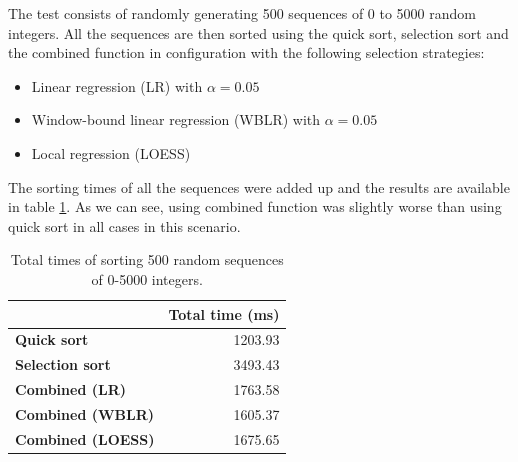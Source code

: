 The test consists of randomly generating 500 sequences of 0 to 5000 random integers. All the sequences are then sorted using the quick sort, selection sort and the combined function in configuration with the following selection strategies:

\begin{itemize}
	\item Linear regression (LR) with $\alpha = 0.05$
	\item Window-bound linear regression (WBLR) with $\alpha = 0.05$
	\item Local regression (LOESS)
\end{itemize}

The sorting times of all the sequences were added up and the results are available in table \ref{tab:sorting_results}. As we can see, using combined function was slightly worse than using quick sort in all cases in this scenario.

\begin{table}[h!]
	\captionsetup{justification=centering,margin=0.5cm}
	\bgroup
	\def\arraystretch{1.5}%
	\begin{center}
	\begin{tabular}{|l|r|}
		\hline
		& \multicolumn{1}{c|}{\textbf{Total time (ms)}} \\ \hline
		\textbf{Quick sort}                  & 1203.93                                       \\ \hline
		\textbf{Selection sort}              & 3493.43                                       \\ \hline
		\textbf{Combined (LR)}               & 1763.58                                       \\ \hline
		\textbf{Combined (WBLR)}  & 1605.37                                       \\ \hline
		\textbf{Combined (LOESS)} & 1675.65                                       \\ \hline
	\end{tabular}
\end{center}
\egroup
\caption{Total times of sorting 500 random sequences of 0-5000 integers.}
\label{tab:sorting_results}
\end{table}


